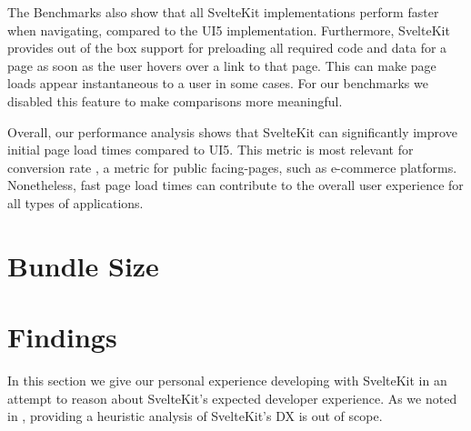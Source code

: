 The Benchmarks also show that all SvelteKit implementations perform faster when navigating, compared to the UI5 implementation. Furthermore, SvelteKit provides out of the box support for preloading all required code and data for a page as soon as the user hovers over a link to that page. This can make page loads appear instantaneous to a user in some cases. For our benchmarks we disabled this feature to make comparisons more meaningful.

Overall, our performance analysis shows that SvelteKit can significantly improve initial page load times compared to UI5. This metric is most relevant for conversion rate \cite{noauthor_load_nodate}, a metric for public facing-pages, such as e-commerce platforms. Nonetheless, fast page load times can contribute to the overall user experience for all types of applications. 


\section{Bundle Size}

\section{Findings}
In this section we give our personal experience developing with SvelteKit in an attempt to reason about SvelteKit's expected developer experience. As we noted in , providing a heuristic analysis of SvelteKit's DX is out of scope.

